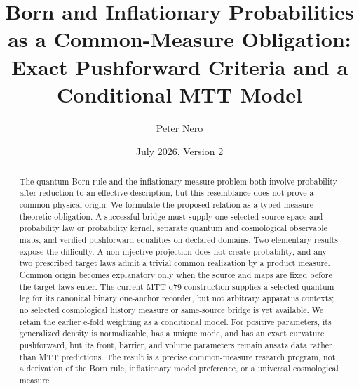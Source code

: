 \documentclass[11pt]{article}
\title{Born and Inflationary Probabilities as a Common-Measure Obligation:\\
\large Exact Pushforward Criteria and a Conditional MTT Model}
\author{Peter Nero}
\date{July 2026, Version 2}
\begin{document}
\maketitle

\begin{abstract}
The quantum Born rule and the inflationary measure problem both involve
probability after reduction to an effective description, but this resemblance
does not prove a common physical origin. We formulate the proposed relation as
a typed measure-theoretic obligation. A successful bridge must supply one
selected source space and probability law or probability kernel, separate
quantum and cosmological observable maps, and verified pushforward equalities
on declared domains. Two elementary results expose the difficulty. A
non-injective projection does not create probability, and any two prescribed
target laws admit a trivial common realization by a product measure. Common
origin becomes explanatory only when the source and maps are fixed before the
target laws enter. The current MTT q79 construction supplies a selected quantum
leg for its canonical binary one-anchor recorder, but not arbitrary apparatus
contexts; no selected cosmological history measure or same-source bridge is yet
available. We retain the earlier e-fold weighting as a conditional model. For
positive parameters, its generalized density is normalizable, has a unique
mode, and has an exact curvature pushforward, but its front, barrier, and volume
parameters remain ansatz data rather than MTT predictions. The result is a
precise common-measure research program, not a derivation of the Born rule,
inflationary model preference, or a universal cosmological measure.
\end{abstract}
\end{document}

